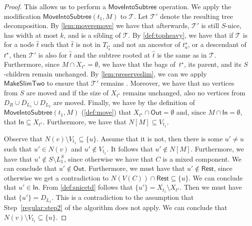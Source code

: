 \documentclass[a4paper,UKenglish,cleveref, autoref, thm-restate, numberwithinsect]{lipics-v2021}
\newcounter{modification}
\newcounter{algorithm}
\newcommand{\slim}{\text{slim}\xspace}
\newcommand{\topheavy}{\text{top-heavy}\xspace}
\newcommand{\In}{\mathsf{In}}
\newcommand{\Out}{\mathsf{Out}}
\newcommand{\Rest}{\mathsf{Rest}}
\newcommand{\MoveIntoSubtree}{\mathsf{MoveIntoSubtree}}
\newcommand{\MakeSlimTwo}{\mathsf{MakeSlimTwo}}
\begin{document}
\begin{proof}
This allows us to perform a $\MoveIntoSubtree$ operation. We apply the modification $\MoveIntoSubtree(t_1,M)$ to $\mathcal{T}$. 
        Let $\mathcal{T}'$ denote the resulting tree decomposition.
        By \cref{lem:moveremove} we have that afterwards, 
        $\mathcal{T}'$ is still $S$-nice, has width at most $k$, and is a sibling of $\mathcal{T}$. 
        By \cref{def:topheavy}, we have that
        if $\mathcal{T}$ is \topheavy for a node $\hat{t}$ such that $\hat{t}$ is not in $T_{t^\star_a}$ and not an ancestor of $t^\star_a$, or
         a descendant of $t^\star$,
then $\mathcal{T}'$ is also \topheavy for $\hat{t}$ and the subtree rooted at $\hat{t}$ is the same as in $\mathcal{T}$.
Furthermore, since $M\cap X_{t^\star}=\emptyset$, we have that the bags of~$t^\star$, its parent, and its $S$-children remain unchanged. 
By \cref{lem:preserveslim}, we can we apply $\MakeSlimTwo$ to ensure that $\mathcal{T}'$ remains \slim.
Moreover, we have that no vertices from $S$ are moved and if the size of $X_{t^\star}$ remains unchanged, also no vertices from $D_R\cup D_{L_1}\cup D_{L_2}$ are moved.
Finally, we have by the definition of $\MoveIntoSubtree(t_1,M)$ (\cref{def:move}) that $X_{t^\star}\cap \Out=\emptyset$ and, since $M\cap \In=\emptyset$, that $\In\subseteq X_{t^\star}$. Furthermore, we have that $N[M]\subseteq V_{t_1}$. 
        
     Observe that $N(v)\setminus V_{t_1}\subseteq \{u\}$. Assume that it is not, then there is some $u'\neq u$ such that $u'\in N(v)$ and $u'\notin V_{t_1}$. It follows that $u'\notin N[M]$. Furthermore, we have that $u'\notin S\setminus L_1^S$, since otherwise we have that $C$ is a mixed component. We can conclude that $u'\notin \Out$. 
     Furthermore, we must have that $u'\notin\Rest$, since otherwise we get a contradiction to $N(V(C))\cap \Rest\subseteq \{u\}$. We can conclude that $u'\in \In$. From \cref{def:snicetd} follows that $\{u'\}=X_{t_1}\setminus X_{t^\star}$. 
     Then we must have that $\{u'\}=D_{L_1}$.
This is a contradiction to the assumption that Step~\ref{regular:step2} of the algorithm does not apply.
We can conclude that $N(v)\setminus V_{t_1}\subseteq \{u\}$.


\end{proof}
\end{document}
